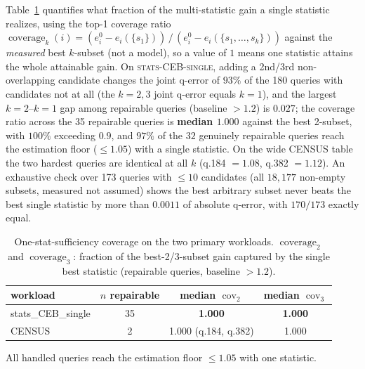 \documentclass[sigconf, nonacm]{acmart}
\begin{document}
Table~\ref{tab:coverage} quantifies what fraction of the multi-statistic gain a
single statistic realizes, using the top-1 coverage ratio
$\operatorname{coverage}_k(i)=(e_i^0-e_i(\{s_1\}))\,/\,(e_i^0-e_i(\{s_1,\dots,s_k\}))$
against the \emph{measured} best $k$-subset (not a model), so a value of $1$
means one statistic attains the whole attainable gain. On
\textsc{stats-CEB-single}, adding a 2nd/3rd non-overlapping candidate changes the
joint q-error of $93\%$ of the 180 queries with candidates not at all (the
$k{=}2,3$ joint q-error equals $k{=}1$), and the largest $k{=}2$--$k{=}1$ gap
among repairable queries (baseline $>1.2$) is $0.027$; the coverage ratio across
the 35 repairable queries is \textbf{median $1.000$} against the best 2-subset,
with $100\%$ exceeding $0.9$, and $97\%$ of the $32$ genuinely repairable
queries reach the estimation floor ($\le1.05$) with a single statistic. On the
wide CENSUS table the two hardest queries are identical at all $k$ (q.184
$=1.08$, q.382 $=1.12$). An exhaustive check over 173 queries with $\le10$
candidates (all $18{,}177$ non-empty subsets, measured not assumed) shows the
best arbitrary subset never beats the best single statistic by more than
$0.0011$ of absolute q-error, with $170/173$ exactly equal.

\begin{table}[t]
\caption{One-stat-sufficiency coverage on the two primary workloads.
$\operatorname{coverage}_2$ and $\operatorname{coverage}_3$: fraction of the
best-2/3-subset gain captured by the single best statistic (repairable queries,
baseline $>1.2$).}
\label{tab:coverage}
\small
\begin{tabular}{lccc}
\toprule
workload & $n$ repairable & median $\operatorname{cov}_2$ & median $\operatorname{cov}_3$\\
\midrule
stats\_CEB\_single & 35 & \textbf{1.000} & \textbf{1.000}\\
CENSUS & 2 & 1.000 (q.184, q.382) & 1.000\\
\bottomrule
\end{tabular}

{\footnotesize All handled queries reach the estimation floor $\le1.05$ with one statistic.}
\end{table}
\end{document}
